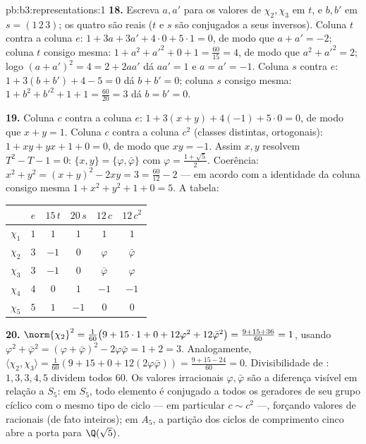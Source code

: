 \begin{solution}{pb:b3:representations:1}
\textbf{18.} Escreva $a, a'$ para os valores de $\chi_2, \chi_3$
em $t$, e $b, b'$ em $s = (1\,2\,3)$; os quatro são reais ($t$
e $s$ são conjugados a seus inversos). Coluna $t$ contra a
coluna $e$: $1 + 3a + 3a' + 4\cdot0 + 5\cdot1 = 0$, de modo que $a + a'
= -2$; coluna $t$ consigo mesma: $1 + a^2 + a'^2 + 0 + 1 =
\frac{60}{15} = 4$, de modo que $a^2 + a'^2 = 2$; logo $(a + a')^2 = 4
= 2 + 2aa'$ dá $aa' = 1$ e $a = a' = -1$. Coluna $s$
contra $e$: $1 + 3(b + b') + 4 - 5 = 0$ dá $b + b' = 0$;
coluna $s$ consigo mesma: $1 + b^2 + b'^2 + 1 + 1 = \frac{60}
{20} = 3$ dá $b = b' = 0$.

\textbf{19.} Coluna $c$ contra a coluna $e$: $1 + 3(x + y) +
4(-1) + 5\cdot0 = 0$, de modo que $x + y = 1$. Coluna $c$ contra a
coluna $c^2$ (classes distintas, ortogonais): $1 + xy + yx + 1
+ 0 = 0$, de modo que $xy = -1$. Assim $x, y$ resolvem $T^2 - T - 1 = 0$:
$\{x, y\} = \{\varphi, \bar\varphi\}$ com $\varphi = \frac{1 +
\sqrt5}2$. Coerência: $x^2 + y^2 = (x+y)^2 - 2xy = 3 =
\frac{60}{12} - 2$ --- em acordo com a identidade da coluna consigo mesma $1 +
x^2 + y^2 + 1 + 0 = 5$. A tabela:
\begin{center}
\begin{tabular}{c|ccccc}
 & $e$ & $15\,t$ & $20\,s$ & $12\,c$ & $12\,c^2$\\
\hline
$\chi_1$ & $1$ & $1$ & $1$ & $1$ & $1$\\
$\chi_2$ & $3$ & $-1$ & $0$ & $\varphi$ & $\bar\varphi$\\
$\chi_3$ & $3$ & $-1$ & $0$ & $\bar\varphi$ & $\varphi$\\
$\chi_4$ & $4$ & $0$ & $1$ & $-1$ & $-1$\\
$\chi_5$ & $5$ & $1$ & $-1$ & $0$ & $0$\\
\end{tabular}
\end{center}

\textbf{20.} $\norm{\chi_2}^2 = \frac1{60}\bigl(9 + 15\cdot1 +
0 + 12\varphi^2 + 12\bar\varphi^2\bigr) = \frac{9 + 15 +
36}{60} = 1$, usando $\varphi^2 + \bar\varphi^2 = (\varphi +
\bar\varphi)^2 - 2\varphi\bar\varphi = 1 + 2 = 3$. Analogamente,
$\langle\chi_2, \chi_3\rangle = \frac1{60}(9 + 15 + 0 +
12(2\varphi\bar\varphi)) = \frac{9 + 15 - 24}{60} = 0$.
Divisibilidade de : $1, 3, 3, 4, 5$ dividem todos $60$.
Os valores irracionais $\varphi, \bar\varphi$ são a diferença
visível em relação a $S_5$: em $S_5$, todo elemento é conjugado a
todos os geradores de seu grupo cíclico com o mesmo tipo de ciclo
--- em particular $c \sim c^2$ ---, forçando valores de  racionais (de fato
inteiros); em $A_5$, a partição dos
ciclos de comprimento cinco abre a porta para $\Q(\sqrt5)$.


\end{solution}
